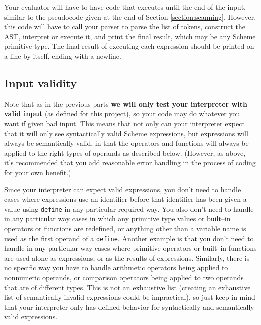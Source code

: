 \documentclass[11pt]{article}
\begin{document}
      Your evaluator will have to have code that executes until the end of the
    input, similar to the pseudocode given at the end of Section
    \ref{section:scanning}.  However, this code will have to call your
    parser to parse the list of tokens, construct the AST, interpret or
    execute it, and print the final result, which may be any Scheme
    primitive type.  The final result of executing each expression should be
    printed on a line by itself, ending with a newline.

    \subsection{Input validity}

      Note that as in the previous parts \textbf{we will only test your
    interpreter with valid input} (as defined for this project), so your
    code may do whatever you want if given bad input.  This means that not
    only can your interpreter expect that it will only see syntactically
    valid Scheme expressions, but expressions will always be semantically
    valid, in that the operators and functions will always be applied to the
    right types of operands as described below.  (However, as above, it's
    recommended that you add reasonable error handling in the process of
    coding for your own benefit.)

      Since your interpreter can expect valid expressions, you don't need to
    handle cases where expressions use an identifier before that identifier
    has been given a value using \texttt{define} in any particular required
    way.  You also don't need to handle in any particular way cases in which
    any primitive type values or built--in operators or functions are
    redefined, or anything other than a variable name is used as the first
    operand of a \texttt{define}.  Another example is that you don't need to
    handle in any particular way cases where primitive operators or
    built--in functions are used alone as expressions, or as the results of
    expressions.  Similarly, there is no specific way you have to handle
    arithmetic operators being applied to nonnumeric operands, or comparison
    operators being applied to two operands that are of different types.
    This is not an exhaustive list (creating an exhaustive list of
    semantically invalid expressions could be impractical), so just keep in
    mind that your interpreter only has defined behavior for syntactically
    and semantically valid expressions.
\end{document}
